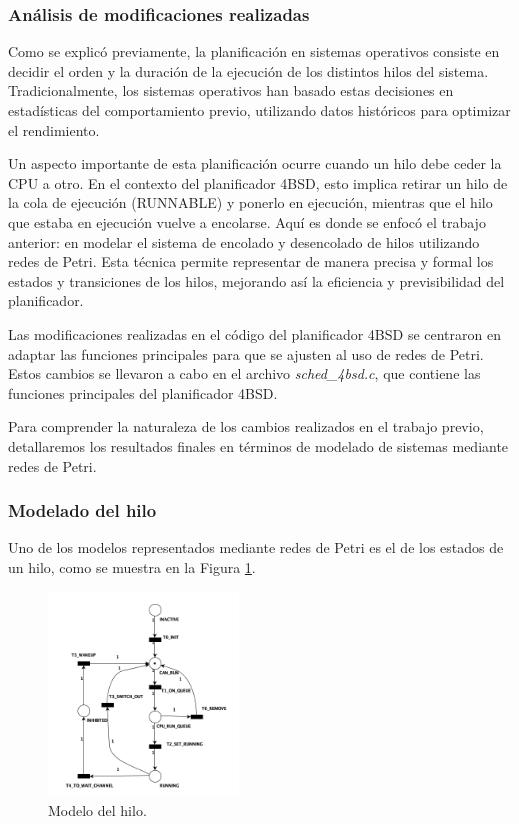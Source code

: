 \subsubsection{Análisis de modificaciones realizadas}

Como se explicó previamente, la planificación en sistemas operativos consiste en decidir el orden y la duración de la ejecución de los distintos hilos del sistema. Tradicionalmente, los sistemas operativos han basado estas decisiones en estadísticas del comportamiento previo, utilizando datos históricos para optimizar el rendimiento.

Un aspecto importante de esta planificación ocurre cuando un hilo debe ceder la CPU a otro. En el contexto del planificador 4BSD, esto implica retirar un hilo de la cola de ejecución (RUNNABLE) y ponerlo en ejecución, mientras que el hilo que estaba en ejecución vuelve a encolarse. Aquí es donde se enfocó el trabajo anterior: en modelar el sistema de encolado y desencolado de hilos utilizando redes de Petri. Esta técnica permite representar de manera precisa y formal los estados y transiciones de los hilos, mejorando así la eficiencia y previsibilidad del planificador.

Las modificaciones realizadas en el código del planificador 4BSD se centraron en adaptar las funciones principales para que se ajusten al uso de redes de Petri. Estos cambios se llevaron a cabo en el archivo \textit{sched\_4bsd.c}, que contiene las funciones principales del planificador 4BSD.

Para comprender la naturaleza de los cambios realizados en el trabajo previo, detallaremos los resultados finales en términos de modelado de sistemas mediante redes de Petri.

\subsubsection{Modelado del hilo}

Uno de los modelos representados mediante redes de Petri es el de los estados de un hilo, como se muestra en la Figura \ref{fig:threadModel}.\par

\begin{figure}[h]
    \centering
    \includegraphics[width=0.45\textwidth]{images/Thread_Net.png}
    \caption{Modelo del hilo.}
    \label{fig:threadModel}
\end{figure}

